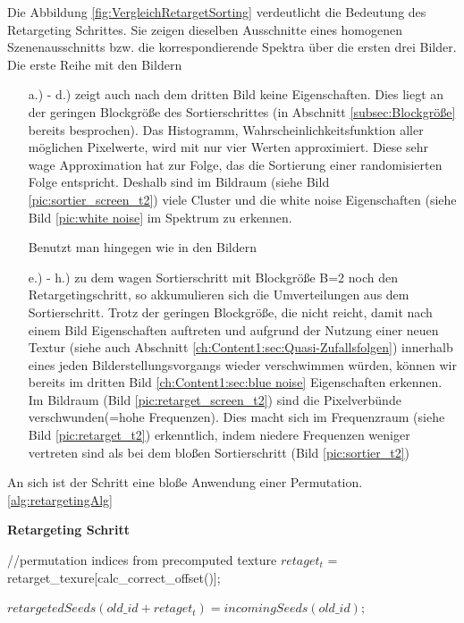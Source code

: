 Die Abbildung \ref{fig:VergleichRetargetSorting} verdeutlicht die Bedeutung des Retargeting 
Schrittes. Sie zeigen dieselben Ausschnitte eines homogenen Szenenausschnitts bzw. die korrespondierende 
Spektra über die ersten drei Bilder. Die erste Reihe mit den Bildern
\begin{itemize}
    \item[a.) - d.)] zeigt auch nach dem dritten Bild keine  Eigenschaften.
                     Dies liegt an der geringen Blockgröße des Sortierschrittes 
                     (in Abschnitt \ref{subsec:Blockgröße} bereits besprochen). Das Histogramm, Wahrscheinlichkeitsfunktion
                     aller möglichen Pixelwerte, wird mit nur vier Werten approximiert. Diese sehr wage Approximation 
                     hat zur Folge, das die Sortierung einer randomisierten Folge entspricht. Deshalb sind im Bildraum
                     (siehe Bild \ref{pic:sortier_screen_t2}) viele Cluster und die white noise Eigenschaften 
                     (siehe Bild \ref{pic:white noise} im Spektrum zu erkennen.
                     \par 
                    Benutzt man hingegen wie in den Bildern  
    \item[e.) - h.)] zu dem wagen Sortierschritt mit Blockgröße B=2 noch den Retargetingschritt, so akkumulieren sich die 
                    Umverteilungen aus dem Sortierschritt. Trotz der geringen Blockgröße, die nicht reicht, damit nach einem 
                    Bild  Eigenschaften auftreten und aufgrund der Nutzung einer neuen 
                    Textur (siehe auch Abschnitt \ref{ch:Content1:sec:Quasi-Zufallsfolgen}) innerhalb eines jeden 
                    Bilderstellungsvorgangs wieder verschwimmen würden, können wir bereits im dritten Bild 
                    \ref{ch:Content1:sec:blue noise} Eigenschaften erkennen. Im Bildraum (Bild \ref{pic:retarget_screen_t2})
                    sind die Pixelverbünde verschwunden(=hohe Frequenzen). Dies macht sich im Frequenzraum 
                    (siehe Bild \ref{pic:retarget_t2}) erkenntlich, indem niedere Frequenzen weniger vertreten sind 
                    als bei dem bloßen Sortierschritt (Bild \ref{pic:sortier_t2})
\end{itemize}

An sich ist der Schritt eine bloße Anwendung einer Permutation.\ref{alg:retargetingAlg}

\begin{algorithm}[H]
    \caption{\textbf{Retargeting Schritt}}
    \begin{algorithmic}[1]
        \State //permutation indices from precomputed texture
        \State $retaget_{t}$ = retarget\_texure[calc\_correct\_offset()];
        
        \State $retargetedSeeds(old\_id + retaget_{t}) = incomingSeeds(old\_id);$
        
    \end{algorithmic}
    \label{alg:retargetingAlg}
\end{algorithm}

